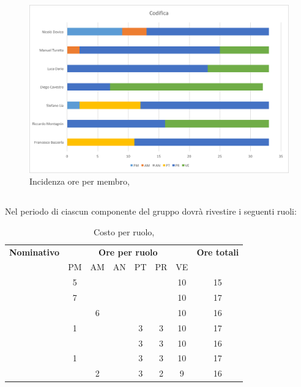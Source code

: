\begin{figure}[H]
	\centering 
	\includegraphics[scale=0.7]{Immagini/GraficiPianoLavoro/COD.png}
	\caption{Incidenza ore per membro, \COD}
\end{figure}

\newpage
\subsection{\VV}
Nel periodo di \VV{} ciascun componente del gruppo dovrà rivestire i seguenti ruoli:

\begin{table}[h]
	\begin{center}
		\begin{tabular}{|c|c|c|c|c|c|c|c|}
			\hline
			\textbf{Nominativo} & \multicolumn{6}{c|}{\textbf{Ore per ruolo}} & \textbf{Ore totali} \\
					& PM & AM & AN & PT & PR & VE & \\
			\hline
			\FB		& 5  &	  &	   &	&	 & 10 &	15	\\
			\hline
			\RM		& 7	 &	  &	   &	&	 & 10 & 17	\\
			\hline
			\SL		&	 & 6  &	   &	&	 & 10 &	16	\\
			\hline
			\DC		& 1	 &	  &  & 3  &	3 & 10 &	17	\\
			\hline
			\LD 	&	 &	  &	   & 3	&	3 & 10 &	16	\\
			\hline
			\MT		& 1 	 &	  &	   & 3	&	3 & 10 &	17	\\
			\hline
			\ND 	&	 & 2  &	   & 3	&	2 & 9 & 16	\\
			\hline
		\end{tabular}
	\end{center}
	\caption{Costo per ruolo, \VV}
\end{table}


